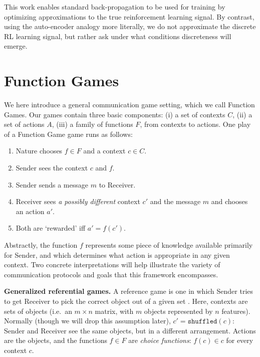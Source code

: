 \documentclass[11pt,a4paper]{article}
\newcommand{\nbSST}[1]{{\leavevmode\color{violet}{\scriptsize#1}}}
\begin{document}
This work enables standard back-propagation to be used for training by optimizing approximations to the true reinforcement learning signal.  By contrast, using the auto-encoder analogy more literally, we do not approximate the discrete RL learning signal, but rather ask under what conditions discreteness will emerge. \nbSST{Probably can be worded better.}

\section{Function Games}

We here introduce a general communication game setting, which we call Function Games.  Our games contain three basic components: (i) a set of contexts $C$, (ii) a set of actions $A$, (iii) a family of functions $F$, from contexts to actions.  One play of a Function Game game runs as follows:
\begin{enumerate}[noitemsep]
	\item Nature chooses $f \in F$ and a context $c \in C$.
	\item Sender sees the context $c$ and $f$.
	\item Sender sends a message $m$ to Receiver.
	\item Receiver sees \emph{a possibly different} context $c'$ and the message $m$ and chooses an action $a'$.
	\item Both are `rewarded' iff $a' = f(c')$.
\end{enumerate}
Abstractly, the function $f$ represents some piece of knowledge available primarily for Sender, and which determines what action is appropriate in any given context. Two concrete interpretations will help illustrate the variety of communication protocols and goals that this framework encompasses.

\noindent \textbf{Generalized referential games.}  A reference game is one in which Sender tries to get Receiver to pick the correct object out of a given set \citep{Skyrms2010, Lazaridou2017, Lazaridou2018, Havrylov2017, Chaabouni2019a}.  Here, contexts are sets of objects (i.e.\ an $m \times n$ matrix, with $m$ objects represented by $n$ features).  Normally (though we will drop this assumption later), $c' = \texttt{shuffled}(c)$: Sender and Receiver see the same objects, but in a different arrangement. Actions are the objects, and the functions $f \in F$ are \emph{choice functions}: $f(c) \in c$ for every context $c$.
\end{document}
